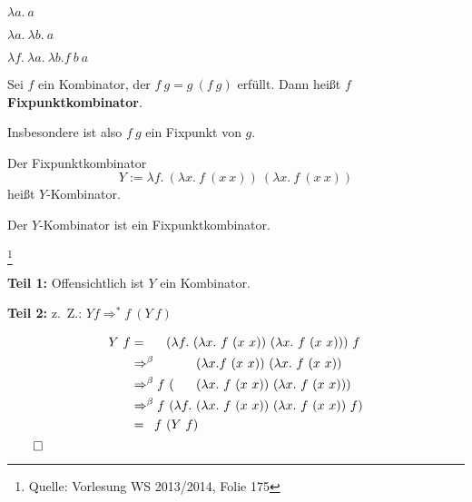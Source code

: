 \begin{beispiel}%
    \begin{bspenum}
        \item $\lambda a.\ a$
        \item $\lambda a.\ \lambda b.\ a$
        \item $\lambda f.\ \lambda a.\ \lambda b. f\ b\ a$
    \end{bspenum}
\end{beispiel}

\begin{definition}%
    Sei $f$ ein Kombinator, der $f\ g = g\ (f\ g)$ erfüllt. Dann heißt $f$
    \textbf{Fixpunktkombinator}.
\end{definition}

Insbesondere ist also $f \ g$ ein Fixpunkt von $g$.

\begin{definition}[Y-Kombinator]%
    Der Fixpunktkombinator
    \[Y := \lambda f.\ (\lambda x.\ f\ (x\ x))\ (\lambda x.\ f\ (x\ x))\]
    heißt $Y$-Kombinator.
\end{definition}

\begin{behauptung}
    Der $Y$-Kombinator ist ein Fixpunktkombinator.
\end{behauptung}

\begin{beweis}\footnote{Quelle: Vorlesung WS 2013/2014, Folie 175}\leavevmode

    \textbf{Teil 1:} Offensichtlich ist $Y$ ein Kombinator.

    \textbf{Teil 2:} z.~Z.: $Y f \Rightarrow^* f \ (Y \ f)$

    \begin{align*}
        Y\ f     &=\hphantom{^\beta f\ } (\lambda f.\ (\lambda x.\ f\ (x\ x))\ (\lambda x.\ f\ (x\ x)))\ f\\
                 &\Rightarrow^\beta\hphantom{f \ (\lambda f.\ }  (\lambda x. f\ (x\ x))\ (\lambda x.\ f\ (x\ x))\\
                 &\Rightarrow^\beta  f \ (\hphantom{\lambda f.\ }(\lambda x.\ f\ (x\ x))\ (\lambda x.\ f\ (x\ x)))\\
                 &\Rightarrow^\beta  f \ (\lambda f.\ (\lambda x.\ f\ (x\ x))\ (\lambda x.\ f\ (x\ x))\ f)\\
                 &=\hphantom{^\beta} f \ (Y \ f)
    \end{align*}
    $\qed$
\end{beweis}

